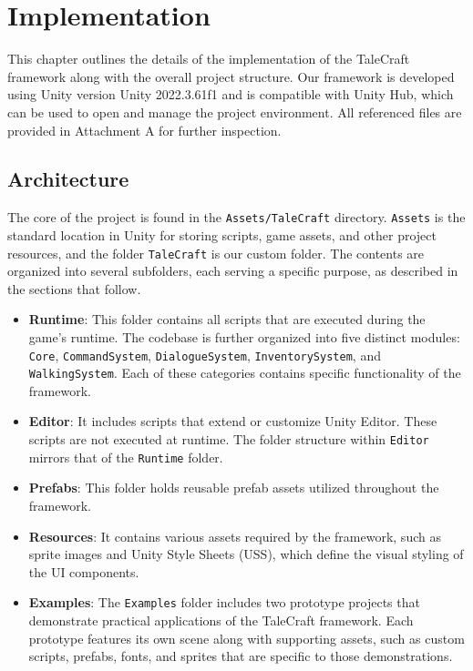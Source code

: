 \chapter{Implementation}
This chapter outlines the details of the implementation of the TaleCraft framework along with the overall project structure. Our framework is developed using Unity version Unity 2022.3.61f1 and is compatible with Unity Hub, which can be used to open and manage the project environment. All referenced files are provided in Attachment A for further inspection.

\section{Architecture}
The core of the project is found in the \verb|Assets/TaleCraft| directory. \verb|Assets| is the standard location in Unity for storing scripts, game assets, and other project resources, and the folder \verb|TaleCraft| is our custom folder. The contents are organized into several subfolders, each serving a specific purpose, as described in the sections that follow.

\begin{itemize}
    \item \textbf{Runtime}: This folder contains all scripts that are executed during the game’s runtime. The codebase is further organized into five distinct modules: \verb|Core|, \verb|CommandSystem|, \verb|DialogueSystem|, \verb|InventorySystem|, and \verb|WalkingSystem|. Each of these categories contains specific functionality of the framework.
    \item \textbf{Editor}: It includes scripts that extend or customize Unity Editor. These scripts are not executed at runtime. The folder structure within \verb|Editor| mirrors that of the \verb|Runtime| folder.
    \item \textbf{Prefabs}: This folder holds reusable prefab assets utilized throughout the framework.
    \item \textbf{Resources}: It contains various assets required by the framework, such as sprite images and Unity Style Sheets (USS), which define the visual styling of the UI components. 
    \item \textbf{Examples}: The \verb|Examples| folder includes two prototype projects that demonstrate practical applications of the TaleCraft framework. Each prototype features its own scene along with supporting assets, such as custom scripts, prefabs, fonts, and sprites that are specific to those demonstrations. 
\end{itemize}

